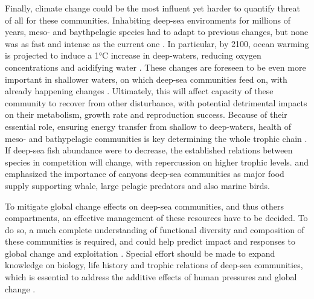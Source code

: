 Finally, climate change could be the most influent yet harder to quantify threat of all for these communities. Inhabiting deep-sea environments for millions of years, meso- and baythpelagic species had to adapt to previous changes, but none was as fast and intense as the current one \citep{catul2011}. In particular, by 2100, ocean warming is projected to induce a 1°C increase in deep-waters, reducing oxygen concentrations and acidifying water \citep{danovaro2017}. These changes are foreseen to be even more important in shallower waters, on which deep-sea communities feed on, with already happening changes \citep{danovaro2017}. Ultimately, this will affect capacity of these community to recover from other disturbance, with potential detrimental impacts on their metabolism, growth rate and reproduction success. Because of their essential role, ensuring energy transfer from shallow to deep-waters, health of meso- and bathypelagic communities is key determining the whole trophic chain \citep{davison2015,gaskett2001}. If deep-sea fish abundance were to decrease, the established relations between species in competition will change, with repercussion on higher trophic levels. \citet{aissi2012} and \citet{kenchington2020} emphasized the importance of canyons deep-sea communities as major food supply supporting whale, large pelagic predators and also marine birds. 

To mitigate global change effects on deep-sea communities, and thus others compartments, an effective management of these resources have to be decided. To do so, a much complete understanding of functional diversity and composition of these communities is required, and could help predict impact and responses to global change and exploitation \citep{carrington2021,dumay2004,kremer2017}. Special effort should be made to expand knowledge on biology, life history and trophic relations of deep-sea communities, which is essential to address the additive effects of human pressures and global change \citep{danovaro2017}.



